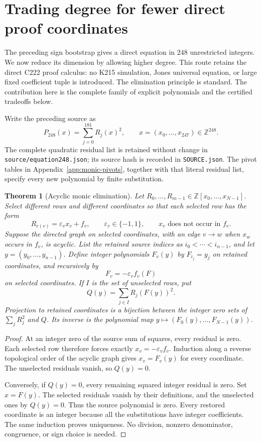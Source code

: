 \documentclass[11pt,letterpaper]{article}
\newcommand{\Z}{\mathbb Z}
\newtheorem{theorem}{Theorem}[section]
\theoremstyle{definition}
\theoremstyle{remark}
\begin{document}
\section{Trading degree for fewer direct proof coordinates}
\label{sec:monic-elimination}

The preceding sign bootstrap gives a direct equation in $248$ unrestricted
integers.  We now reduce its dimension by allowing higher degree.  This
route retains the direct C222 proof calculus: no K215 simulation, Jones
universal equation, or large fixed coefficient tuple is introduced.
The elimination principle is standard.  The contribution here is the
complete family of explicit polynomials and the certified tradeoffs below.

Write the preceding source as
\[
 P_{248}(x)=\sum_{j=0}^{181}R_j(x)^2,
 \qquad x=(x_0,\ldots,x_{247})\in\Z^{248}.
\]
The complete quadratic residual list is retained without change in
\texttt{source/equation248.json}; its source hash is recorded in
\texttt{SOURCE.json}.  The pivot tables in
Appendix~\ref{app:monic-pivots}, together with that literal residual list,
specify every new polynomial by finite substitution.

\begin{theorem}[Acyclic monic elimination]
\label{thm:acyclic-monic}
Let $R_0,\ldots,R_{m-1}\in\Z[x_0,\ldots,x_{N-1}]$.
Select different rows and different coordinates so that each selected row
has the form
\[
 R_{r(v)}=\varepsilon_v x_v+f_v,
 \qquad \varepsilon_v\in\{-1,1\},
 \qquad x_v\text{ does not occur in }f_v.
\]
Suppose the directed graph on selected coordinates, with an edge $v\to w$
when $x_w$ occurs in $f_v$, is acyclic.  List the retained source indices
as $i_0<\cdots<i_{n-1}$, and let $y=(y_0,\ldots,y_{n-1})$.
Define integer polynomials $F_v(y)$ by $F_{i_j}=y_j$ on retained
coordinates, and recursively by
\[
 F_v=-\varepsilon_v f_v(F)
\]
on selected coordinates.  If $I$ is the set of unselected rows, put
\[
 Q(y)=\sum_{j\in I}R_j(F(y))^2.
\]
Projection to retained coordinates is a bijection between the integer
zero sets of $\sum_jR_j^2$ and $Q$.  Its inverse is the polynomial map
$y\mapsto(F_0(y),\ldots,F_{N-1}(y))$.
\end{theorem}

\begin{proof}
At an integer zero of the source sum of squares, every residual is zero.
Each selected row therefore forces exactly
$x_v=-\varepsilon_v f_v$.  Induction along a reverse topological order of the
acyclic graph gives $x_v=F_v(y)$ for every coordinate.  The unselected
residuals vanish, so $Q(y)=0$.

Conversely, if $Q(y)=0$, every remaining squared integer residual is zero.
Set $x=F(y)$.  The selected residuals vanish by their definitions, and
the unselected ones by $Q(y)=0$.  Thus the source polynomial is zero.
Every restored coordinate is an integer because all the substitutions
have integer coefficients.  The same induction proves uniqueness.
No division, nonzero denominator, congruence, or sign choice is needed.
\end{proof}
\end{document}
